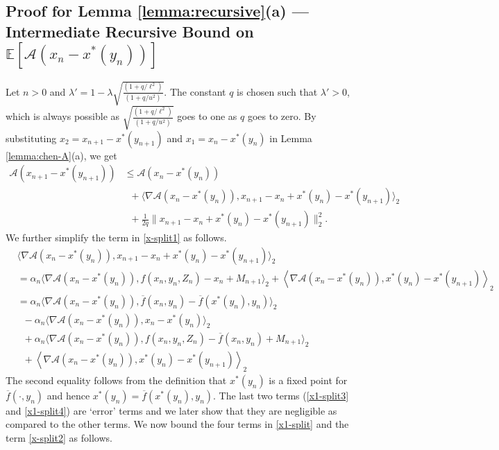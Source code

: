 \documentclass[letterpaper, 10 pt, conference]{ieeeconf}  %
\theoremstyle{definition}
\theoremstyle{plain}
\newcommand{\barf}{\overline{f}}
\newcommand{\xstar}{x^*}
\newcommand{\EE}{\mathbb{E}}
\newcommand{\Acal}{\mathcal{A}}
\begin{document}
\subsection{\textbf{Proof for Lemma \ref{lemma:recursive}(a) --- Intermediate Recursive Bound on $\EE[\Acal(x_n-\xstar(y_n))]$}}
Let $n>0$ and $\lambda'=1-\lambda\sqrt{\frac{(1+q/\ell^2)}{(1+q/u^2)}}$. The constant $q$ is chosen such that $\lambda'>0$, which is always possible as $\sqrt{\frac{(1+q/\ell^2)}{(1+q/u^2)}}$ goes to one as $q$ goes to zero.
By substituting $x_2=x_{n+1}-\xstar(y_{n+1})$ and $x_1=x_n-\xstar(y_n)$ in Lemma \ref{lemma:chen-A}(a), we get   
\begin{subequations}\label{x-split}
\begin{align}
    \Acal(x_{n+1}-\xstar(y_{n+1}))&\leq \Acal(x_{n}-\xstar(y_n))\nonumber\\
    &\;\;+\langle\nabla \Acal(x_n-\xstar(y_n)),x_{n+1}-x_n+\xstar(y_n)-\xstar(y_{n+1})\rangle_2\label{x-split1}\\
    &\;\;+\frac{1}{2q}\|x_{n+1}-x_n+\xstar(y_n)-\xstar(y_{n+1})\|_2^2.\label{x-split2}
\end{align}
\end{subequations}
We further simplify the term in \eqref{x-split1} as follows.
\begin{subequations}\label{x1-split}
\begin{align}
    &\langle\nabla \Acal(x_n-\xstar(y_n)),x_{n+1}-x_n+\xstar(y_n)-\xstar(y_{n+1})\rangle_2\nonumber\\
    &=\alpha_n\langle\nabla \Acal(x_n-\xstar(y_n)),f(x_n,y_n,Z_n)-x_n+M_{n+1}\rangle_2+\left\langle\nabla \Acal(x_n-\xstar(y_n)),\xstar(y_n)-\xstar(y_{n+1})\right\rangle_2\nonumber\\
    &=\alpha_n\langle\nabla \Acal(x_n-\xstar(y_n)),\barf(x_n,y_n)-\barf(\xstar(y_n),y_n)\rangle_2\label{x1-split1}\\
    &\;\;-\alpha_n\langle\nabla \Acal(x_n-\xstar(y_n)),x_n-\xstar(y_n)\rangle_2\label{x1-split2}\\
    &\;\;+\alpha_n\langle\nabla \Acal(x_n-\xstar(y_n)),f(x_n,y_n,Z_n)-\barf(x_n,y_n)+M_{n+1}\rangle_2\label{x1-split3}\\
    &\;\;+\left\langle\nabla \Acal(x_n-\xstar(y_n)),\xstar(y_n)-\xstar(y_{n+1})\right\rangle_2\label{x1-split4}
\end{align}
\end{subequations}
The second equality follows from the definition that $\xstar(y_n)$ is a fixed point for $\barf(\cdot,y_n)$ and hence $\xstar(y_n)=\barf(\xstar(y_n),y_n)$. The last two terms (\eqref{x1-split3} and \eqref{x1-split4}) are `error' terms and we later show that they are negligible as compared to the other terms. We now bound the four terms in \eqref{x1-split} and the term \eqref{x-split2} as follows.
\end{document}
